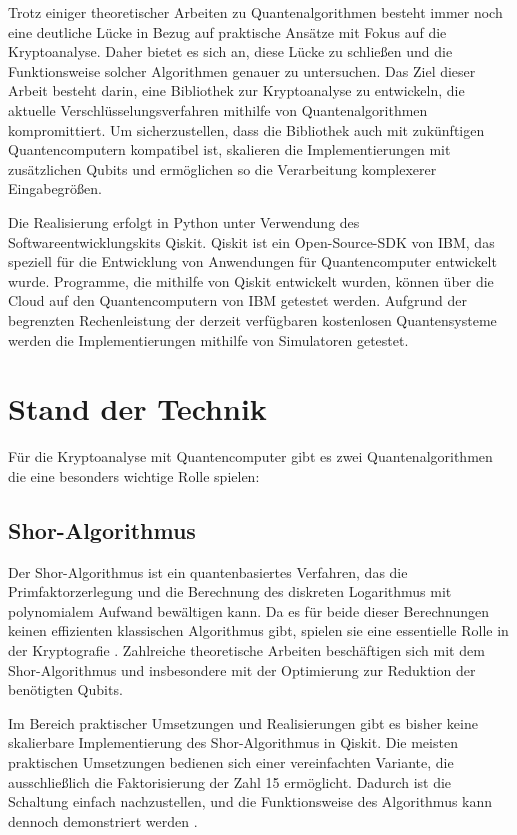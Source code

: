 \documentclass[
	a4paper, %
	10pt, %
	unnumberedsections, %
	twoside, %
]{LTJournalArticle}
\begin{document}
Trotz einiger theoretischer Arbeiten zu Quantenalgorithmen besteht immer noch eine deutliche Lücke in Bezug auf praktische Ansätze mit Fokus auf die Kryptoanalyse. Daher bietet es sich an, diese Lücke zu schließen und die Funktionsweise solcher Algorithmen genauer zu untersuchen. Das Ziel dieser Arbeit besteht darin, eine Bibliothek zur Kryptoanalyse zu entwickeln, die aktuelle Verschlüsselungsverfahren mithilfe von Quantenalgorithmen kompromittiert. Um sicherzustellen, dass die Bibliothek auch mit zukünftigen Quantencomputern kompatibel ist, skalieren die Implementierungen mit zusätzlichen Qubits und ermöglichen so die Verarbeitung komplexerer Eingabegrößen.

Die Realisierung erfolgt in Python unter Verwendung des Softwareentwicklungskits Qiskit. Qiskit ist ein Open-Source-SDK von IBM, das speziell für die Entwicklung von Anwendungen für Quantencomputer entwickelt wurde. Programme, die mithilfe von Qiskit entwickelt wurden, können über die Cloud auf den Quantencomputern von IBM getestet werden. Aufgrund der begrenzten Rechenleistung der derzeit verfügbaren kostenlosen Quantensysteme werden die Implementierungen mithilfe von Simulatoren getestet.



\section{Stand der Technik}
Für die Kryptoanalyse mit Quantencomputer gibt es zwei Quantenalgorithmen die eine besonders wichtige Rolle spielen:

\subsection{Shor-Algorithmus}
Der Shor-Algorithmus ist ein quantenbasiertes Verfahren, das die Primfaktorzerlegung und die Berechnung des diskreten Logarithmus mit polynomialem Aufwand bewältigen kann. Da es für beide dieser Berechnungen keinen effizienten klassischen Algorithmus gibt, spielen sie eine essentielle Rolle in der Kryptografie \autocite{Shor:1997}. Zahlreiche theoretische Arbeiten beschäftigen sich mit dem Shor-Algorithmus und insbesondere mit der Optimierung zur Reduktion der benötigten Qubits.

Im Bereich praktischer Umsetzungen und Realisierungen gibt es bisher keine skalierbare Implementierung des Shor-Algorithmus in Qiskit. Die meisten praktischen Umsetzungen bedienen sich einer vereinfachten Variante, die ausschließlich die Faktorisierung der Zahl 15 ermöglicht. Dadurch ist die Schaltung einfach nachzustellen, und die Funktionsweise des Algorithmus kann dennoch demonstriert werden \autocite{9376169, Monz_2016, IBM:Shor}.
\end{document}
